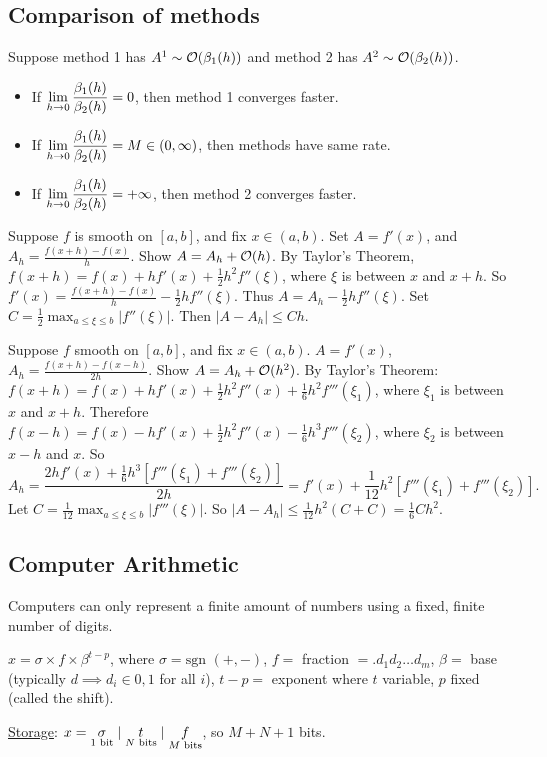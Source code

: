 \documentclass[]{article}
\begin{document}
\subsection*{Comparison of methods}

Suppose method 1 has $A^1\sim\mathcal{O}(\beta_1(h))$ and method 2 has $A^2\sim\mathcal{O}(\beta_2(h))$.
\begin{itemize}
	\item If $\displaystyle\lim_{h\rightarrow0} \frac{\beta_1(h)}{\beta_2(h)}=0$, then method 1 converges faster.
	\item If $\displaystyle\lim_{h\rightarrow0} \frac{\beta_1(h)}{\beta_2(h)}=M\in(0,\infty)$, then methods have same rate.
	\item If $\displaystyle\lim_{h\rightarrow0} \frac{\beta_1(h)}{\beta_2(h)}=+\infty$, then method 2 converges faster.
\end{itemize}
\begin{example}
	Suppose $f$ is smooth on $[a,b]$, and fix $x\in(a,b)$.
	Set $A=f'(x)$, and $A_h = \frac{f(x+h)-f(x)}{h}$.
	Show $A=A_h + \mathcal{O}(h)$.
	By Taylor's Theorem, $f(x+h) = f(x) + hf'(x) + \frac12h^2f''(\xi)$, where $\xi$ is between $x$ and $x+h$.
	So $f'(x) = \frac{f(x+h)-f(x)}{h} -\frac12hf''(\xi)$.
	Thus $A = A_h - \frac12hf''(\xi)$. Set $C = \frac12\displaystyle\max_{a\leq\xi\leq b} |f''(\xi)|$.
	Then $|A-A_h|\leq Ch$.
\end{example}
\begin{example}
	Suppose $f$ smooth on $[a,b]$, and fix $x\in(a,b)$.
	$A = f'(x)$, $A_h = \frac{f(x+h)-f(x-h)}{2h}$.
	Show $A = A_h + \mathcal{O}(h^2)$. By Taylor's Theorem: $f(x+h) = f(x) + hf'(x) + \frac12h^2f''(x) + \frac16h^2f'''(\xi_1)$, where $\xi_1$ is between $x$ and $x+h$.
	Therefore $f(x-h) = f(x) - hf'(x) + \frac12h^2f''(x) - \frac16h^3f'''(\xi_2)$, where $\xi_2$ is between $x-h$ and $x$.
	So $$ A_h = \frac{2hf'(x) + \frac16h^3[f'''(\xi_1)+f'''(\xi_2)]}{2h} = f'(x) + \frac1{12}h^2[f'''(\xi_1)+f'''(\xi_2)].$$
	Let $C = \frac1{12}\displaystyle\max_{a\leq\xi\leq b}|f'''(\xi)|$.
	So $\displaystyle|A-A_h| \leq \frac1{12}h^2(C+C) = \frac16Ch^2$.
\end{example}

\subsection*{Computer Arithmetic}

Computers can only represent a finite amount of numbers using a fixed, finite number of digits.

\begin{definition}
	$x = \sigma\times f\times\beta^{t-p}$, where $\sigma = \text{sgn}$ $(+,-)$, $f=$ fraction $ = .d_1d_2\dots d_m$, $\beta = $ base (typically $d \implies d_i\in{0,1}$ for all $i$), $t-p = $ exponent where $t$ variable, $p$ fixed (called the shift).
	
	\ul{Storage}: $x = \underset{1\text{ bit}}{\sigma}\mid\underset{N\text{ bits}}{t}\mid \underset{M\text{ bits}}{f}$, so $M+N+1$ bits.
\end{definition}
\end{document}
